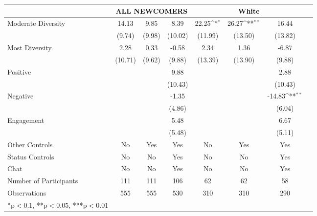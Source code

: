 {\tiny
\def\sym#1{\ifmmode^{#1}\else\(^{#1}\)\fi}
\begin{tabular}{l*{7}{c}}
\toprule
          & \multicolumn{3}{c}{ALL NEWCOMERS}   &\multicolumn{3}{c}{White}     \\
\midrule
Moderate Diversity         &     14.13   &  9.85    &  8.39 & 22.25\sym{*}  &  26.27\sym{**} &  16.44  \\
                           &     (9.74)  &  (9.98)  &  (10.02)  &     (11.99)   &  (13.50)  &  (13.82) \\
\addlinespace
Most Diversity          &      2.28     &   0.33  &  -0.58      &      2.34 &   1.36 &  -6.87 \\
                        &      (10.71)   &   (9.62)  &  (9.88) & (13.39) &   (13.90)  &  (9.88) \\
                        
\addlinespace
Positive       &         &           &  9.88    &     &   &  2.88 \\
              &           &          &  (10.43) &     &   &  (10.43)   \\
\addlinespace
Negative     &           &        &  -1.35 &       &     &  -14.83\sym{**}  \\
             &           &        &  (4.86)   &    &      &  (6.04)  \\
\addlinespace
Engagement    &            &                    &  5.48    &       &        &  6.67 \\
              &             &                    &  (5.48)   &      &        &  (5.11) \\

\midrule
Other Controls   &    No &    Yes &    Yes    &    No  &    Yes &    Yes             \\
Status Controls &    No  &    No    &    Yes    &    No  &    No    &    Yes           \\
Chat          &    No    &    No   &    Yes  &    No    &    No      &    Yes             \\
\midrule
Number of Participants & 111   &    111 &    106  &   62   &    62 &    58     \\
\midrule
Observations          &   555   &  555  &  530   &  310     &  310   &  290             \\
\bottomrule
*p$<$0.1, **p$<$0.05, ***p$<$0.01
\end{tabular}
}